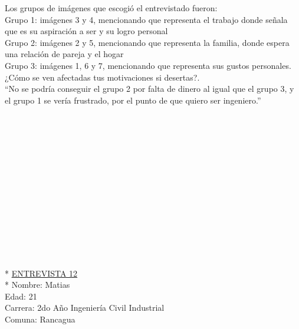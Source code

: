 Los grupos de imágenes que escogió el entrevistado fueron:\\

Grupo 1: imágenes 3 y 4, mencionando que representa el  trabajo donde señala que es su aspiración a ser y su logro personal\\

Grupo 2: imágenes 2 y 5, mencionando que representa la familia, donde espera una relación de pareja y el hogar\\

Grupo 3: imágenes 1, 6 y 7, mencionando que representa sus gustos personales.\\

¿Cómo se ven afectadas tus motivaciones si desertas?.\\

``No se podría conseguir el grupo 2 por falta de dinero al igual que el grupo 3, y el grupo 1 se vería frustrado, por el punto de que quiero ser ingeniero.'' \\
\\
\\
\\
\\
\\
\\
\\
\\
\\
\\
\\
\\
\\
\\*
\underline {ENTREVISTA 12}\\*
Nombre: Matias\\
Edad: 21\\
Carrera: 2do Año Ingeniería Civil Industrial\\
Comuna: Rancagua\\

